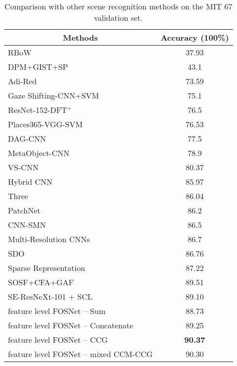 \documentclass[journal,comsoc]{IEEEtran}
\begin{document}
\begin{table}[]
\centering
\caption{Comparison with other scene recognition methods on the MIT 67 \cite{b34} validation set.}
\begin{tabular}{lc}
\toprule
\multicolumn{1}{c}{Methods}           & Accuracy (100\%) \\
\midrule
RBoW \cite{b1}                        & 37.93            \\
DPM+GIST+SP \cite{b2}                 & 43.1             \\
Adi-Red \cite{b6}                     & 73.59            \\
Gaze Shifting-CNN+SVM \cite{b12}      & 75.1             \\
ResNet-152-DFT$^{+}$ \cite{b48}       & 76.5             \\
Places365-VGG-SVM \cite{b20}          & 76.53            \\
DAG-CNN \cite{b10}                    & 77.5             \\
MetaObject-CNN \cite{b14}             & 78.9             \\
VS-CNN \cite{b15}                     & 80.37            \\
Hybrid CNN \cite{b8}                  & 85.97            \\
Three \cite{b7}                       & 86.04            \\
PatchNet \cite{b16}                   & 86.2             \\
CNN-SMN \cite{b13}                    & 86.5             \\
Multi-Resolution CNNs \cite{b5}       & 86.7             \\
SDO \cite{b9}                         & 86.76            \\
Sparse Representation \cite{b17}      & 87.22            \\
SOSF+CFA+GAF \cite{b4}                & 89.51            \\
SE-ResNeXt-101 + SCL                  & 89.10            \\
feature level FOSNet – Sum            & 88.73            \\
feature level FOSNet – Concatenate    & 89.25            \\
feature level FOSNet – CCG           & \textbf{90.37}   \\
feature level FOSNet – mixed CCM-CCG & 90.30           \\
\bottomrule
\end{tabular}
\label{tab3}
\end{table}
\end{document}
